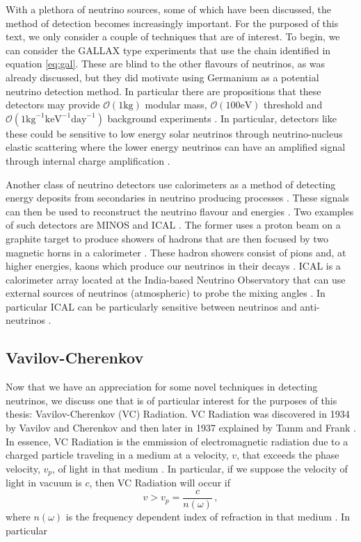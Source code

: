 With a plethora of neutrino sources, some of which have been discussed, the method of detection becomes increasingly important. For the purposed of this text, we only consider a couple of techniques that are of interest. To begin, we can consider the GALLAX type experiments that use the chain identified in equation \ref{eq:gal}. These are blind to the other flavours of neutrinos, as was already discussed, but they did motivate using Germanium as a potential neutrino detection method. In particular there are propositions that these detectors may provide $\mathcal{O}(1 \text{kg})$ modular mass, $\mathcal{O}(100 \text{eV})$ threshold and $\mathcal{O}(1 \text{kg}^{-1}\text{keV}^{-1}\text{day}^{-1})$ background experiments \cite{som_germ}. In particular, detectors like these could be sensitive to low energy solar neutrinos through neutrino-nucleus elastic scattering \cite{germ_low} where the lower energy neutrinos can have an amplified signal through internal charge amplification \cite{germ_low}.

Another class of neutrino detectors use calorimeters as a method of detecting energy deposits from secondaries in neutrino producing processes \cite{minos,ical}. These signals can then be used to reconstruct the neutrino flavour and energies \cite{minos,ical}. Two examples of such detectors are MINOS \cite{minos} and ICAL \cite{ical}. The former uses a proton beam on a graphite target to produce showers of hadrons that are then focused by two magnetic horns in a calorimeter \cite{minos}. These hadron showers consist of pions and, at higher energies, kaons which produce our neutrinos in their decays \cite{minos}. ICAL is a calorimeter array located at the India-based Neutrino Observatory \cite{ical} that can use external sources of neutrinos (atmospheric) to probe the mixing angles \cite{ical}. In particular ICAL can be particularly sensitive between neutrinos and anti-neutrinos \cite{ical}.

\subsection{Vavilov-Cherenkov}

Now that we have an appreciation for some novel techniques in detecting neutrinos, we discuss one that is of particular interest for the purposes of this thesis: Vavilov-Cherenkov (VC) Radiation. VC Radiation was discovered in 1934 by Vavilov \cite{vav_og} and Cherenkov \cite{cher_og} and then later in 1937 explained by Tamm and Frank \cite{tamm}. In essence, VC Radiation is the emmission of electromagnetic radiation due to a charged particle traveling in a medium at a velocity, $v$, that exceeds the phase velocity, $v_{p}$, of light in that medium \cite{ginz}. In particular, if we suppose the velocity of light in vacuum is $c$, then VC Radiation will occur if
\begin{equation}
  v > v_{p} = \frac{c}{n(\omega)}\, ,
\end{equation}
where $n(\omega)$ is the frequency dependent index of refraction in that medium \cite{ginz}. In particular 

